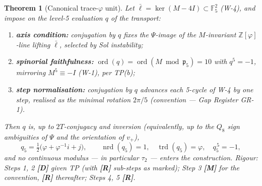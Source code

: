 \documentclass[11pt,a4paper]{article}
\theoremstyle{plain}
\newtheorem{theorem}{Theorem}
\theoremstyle{definition}
\theoremstyle{remark}
\newcommand{\Zphi}{\mathbb{Z}[\varphi]}
\newcommand{\FF}[1]{\mathbb{F}_{#1}}
\newcommand{\pfive}{\mathfrak{p}_5}
\newcommand{\rtag}[1]{\textnormal{\textbf{[#1]}}}
\DeclareMathOperator{\trd}{trd}
\DeclareMathOperator{\nrd}{nrd}
\DeclareMathOperator{\ord}{ord}
\begin{document}
\begin{theorem}[Canonical trace-$\varphi$ unit]\label{thm:q5}
Let $\bar\ell = \ker(M - 4I) \subset \FF5^2$ (W-4), and impose on the level-5 evaluation $q$ of the transport:
\begin{enumerate}[label=\textup{(T\arabic*)}, leftmargin=2.6em]
\item \textbf{axis condition:} conjugation by $q$ fixes the $\Psi$-image of the $M$-invariant $\Zphi$-line lifting $\bar\ell$, selected by Sol instability;
\item \textbf{spinorial faithfulness:} $\ord(q) = \ord(M \bmod \pfive) = 10$ with $q^5 = -1$, mirroring $M^5 \equiv -I$ (W-1), per TP(b);
\item \textbf{step normalisation:} conjugation by $q$ advances each 5-cycle of W-4 by one step, realised as the minimal rotation $2\pi/5$ \emph{(convention --- Gap Register GR-1)}.
\end{enumerate}
Then $q$ is, up to $2T$-conjugacy and inversion (equivalently, up to the $Q_8$ sign ambiguities of $\Psi$ and the orientation of $v_+$),
\begin{equation}\label{eq:q5main}
q_5 = \tfrac12\big(\varphi + \varphi^{-1} i + j\big), \qquad
\nrd(q_5) = 1, \quad \trd(q_5) = \varphi, \quad q_5^{\,5} = -1,
\end{equation}
and no continuous modulus --- in particular $\tau_2$ --- enters the construction.
\emph{Rigour:} Steps 1, 2 \rtag{D} given TP (with \rtag{R} sub-steps as marked); Step 3 \rtag{M} for the convention, \rtag{R} thereafter; Steps 4, 5 \rtag{R}.
\end{theorem}
\end{document}
